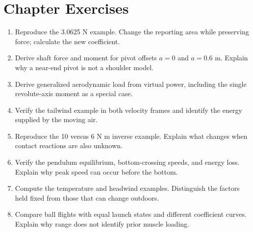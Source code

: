 \section{Chapter Exercises}

\begin{enumerate}[nosep]
\item Reproduce the 3.0625 N example. Change the reporting area while preserving
      force; calculate the new coefficient.
\item Derive shaft force and moment for pivot offsets $a=0$ and $a=0.6$ m.
      Explain why a near-end pivot is not a shoulder model.
\item Derive generalized aerodynamic load from virtual power, including the
      single revolute-axis moment as a special case.
\item Verify the tailwind example in both velocity frames and identify the
      energy supplied by the moving air.
\item Reproduce the 10 versus 6 N m inverse example. Explain what changes
      when contact reactions are also unknown.
\item Verify the pendulum equilibrium, bottom-crossing speeds, and energy loss.
      Explain why peak speed can occur before the bottom.
\item Compute the temperature and headwind examples. Distinguish the factors
      held fixed from those that can change outdoors.
\item Compare ball flights with equal launch states and different coefficient
      curves. Explain why range does not identify prior muscle loading.
\end{enumerate}
